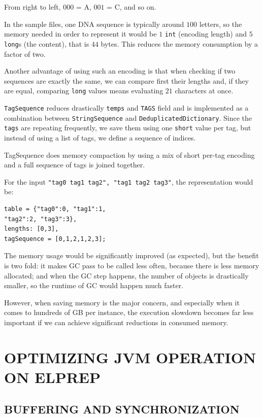 \documentclass[a4paper,twoside]{article}
\begin{document}
From right to left, $000$ = A, $001$ = C, and so on.

In the sample files, one DNA sequence is typically around $100$ letters, so the memory needed in order to represent it would be $1$ {\texttt{int}} (encoding length) and $5$ {\texttt{long}}s (the content), that is $44$ bytes.
This reduces the memory consumption by a factor of two.

Another advantage of using such an encoding is that when checking if two sequences are exactly the same, we can compare first their lengths and, if they are equal, comparing {\texttt{long}} values means evaluating $21$ characters at once.

{\texttt{TagSequence}} reduces drastically {\texttt{temps}} and {\texttt{TAGS}}  field and is implemented as a combination between {\texttt{StringSequence}} and {\texttt{DeduplicatedDictionary}}.
Since the {\texttt{tags}} are repeating frequently, we save them using one {\texttt{short}} value per tag, but instead of using a list of tags, we define a sequence of indices.

TagSequence does memory compaction by using a mix of short per-tag encoding and a full sequence of tags is joined together.

For the input {\texttt{"tag0 tag1 tag2", "tag1 tag2 tag3"}}, the representation would be:
\begin{verbatim}
table = {"tag0":0, "tag1":1, 
"tag2":2, "tag3":3},
lengths: [0,3], 
tagSequence = [0,1,2,1,2,3]; 
\end{verbatim}

The memory usage would be significantly improved (as expected), but the benefit is two fold: it makes GC pass to be called less often, because there is less memory allocated; and when the GC step happens, the number of objects is drastically smaller, so the runtime of GC would happen much faster.


However, when saving memory is the major concern, and especially when it comes to hundreds of GB per instance, the execution slowdown becomes far less important if we can achieve significant reductions in consumed memory.


\section{\uppercase{Optimizing JVM Operation on ElPrep}}
\label{sec:io}

\subsection{\uppercase{Buffering and Synchronization}}
\label{subsec:buffering}
\end{document}
